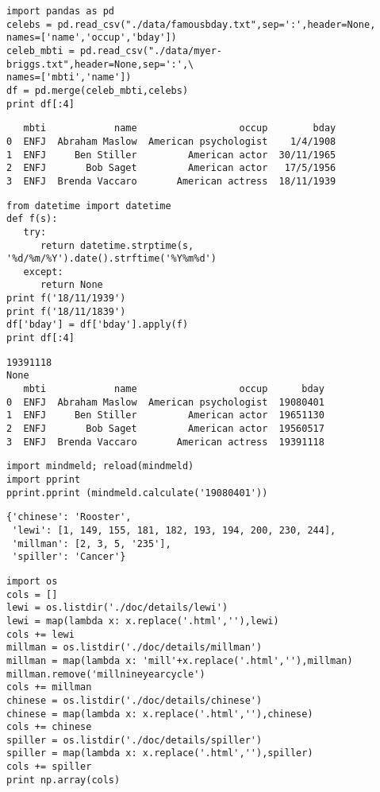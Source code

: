 \documentclass[12pt,fleqn]{article}\usepackage{common}
\begin{document}
\begin{verbatim}
import pandas as pd
celebs = pd.read_csv("./data/famousbday.txt",sep=':',header=None, 
names=['name','occup','bday'])
celeb_mbti = pd.read_csv("./data/myer-briggs.txt",header=None,sep=':',\
names=['mbti','name'])
df = pd.merge(celeb_mbti,celebs)
print df[:4]
\end{verbatim}

\begin{verbatim}
   mbti            name                  occup        bday
0  ENFJ  Abraham Maslow  American psychologist    1/4/1908
1  ENFJ     Ben Stiller         American actor  30/11/1965
2  ENFJ       Bob Saget         American actor   17/5/1956
3  ENFJ  Brenda Vaccaro       American actress  18/11/1939
\end{verbatim}

\begin{verbatim}
from datetime import datetime
def f(s):
   try:
      return datetime.strptime(s, '%d/%m/%Y').date().strftime('%Y%m%d')
   except: 
      return None
print f('18/11/1939')
print f('18/11/1839')
df['bday'] = df['bday'].apply(f)
print df[:4]
\end{verbatim}

\begin{verbatim}
19391118
None
   mbti            name                  occup      bday
0  ENFJ  Abraham Maslow  American psychologist  19080401
1  ENFJ     Ben Stiller         American actor  19651130
2  ENFJ       Bob Saget         American actor  19560517
3  ENFJ  Brenda Vaccaro       American actress  19391118
\end{verbatim}

\begin{verbatim}
import mindmeld; reload(mindmeld)
import pprint
pprint.pprint (mindmeld.calculate('19080401'))
\end{verbatim}

\begin{verbatim}
{'chinese': 'Rooster',
 'lewi': [1, 149, 155, 181, 182, 193, 194, 200, 230, 244],
 'millman': [2, 3, 5, '235'],
 'spiller': 'Cancer'}
\end{verbatim}

\begin{verbatim}
import os
cols = []
lewi = os.listdir('./doc/details/lewi')
lewi = map(lambda x: x.replace('.html',''),lewi)
cols += lewi
millman = os.listdir('./doc/details/millman')
millman = map(lambda x: 'mill'+x.replace('.html',''),millman)
millman.remove('millnineyearcycle')
cols += millman
chinese = os.listdir('./doc/details/chinese')
chinese = map(lambda x: x.replace('.html',''),chinese)
cols += chinese
spiller = os.listdir('./doc/details/spiller')
spiller = map(lambda x: x.replace('.html',''),spiller)
cols += spiller
print np.array(cols)
\end{verbatim}
\end{document}
